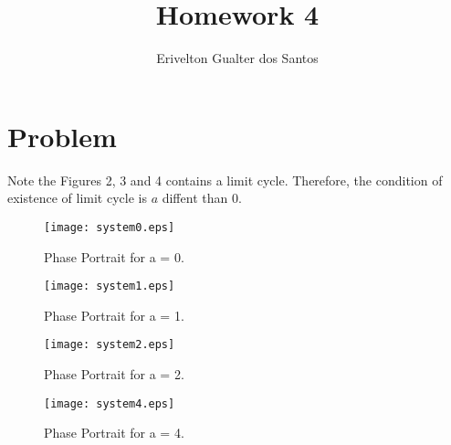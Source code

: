 \documentclass[a4paper,10pt]{article}
\title{Homework 4}
\author{Erivelton Gualter dos Santos}
\begin{document}
\date{}
\maketitle

\section{Problem}

Note the Figures 2, 3 and 4 contains a limit cycle. Therefore, the condition of existence of limit cycle is $a$ diffent than 0. 



\begin{figure}[H]
  \centering
  \texttt{[image: system0.eps]}
  \caption{Phase Portrait for a = 0.} \label{fig:s0}
\end{figure}

\begin{figure}[H]
  \centering
  \texttt{[image: system1.eps]}
  \caption{Phase Portrait for a = 1.} \label{fig:s1}
\end{figure}

\begin{figure}[H]
  \centering
  \texttt{[image: system2.eps]}
  \caption{Phase Portrait for a = 2.} \label{fig:s2}
\end{figure}

\begin{figure}[H]
  \centering
  \texttt{[image: system4.eps]}
  \caption{Phase Portrait for a = 4.} \label{fig:s4}
\end{figure}
\end{document}

